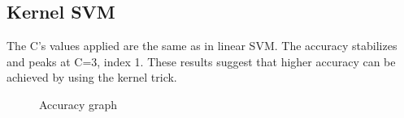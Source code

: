 \subsection{Kernel SVM}
The C's values applied are the same as in linear SVM. The accuracy stabilizes and peaks at C=3, index 1. These results suggest that higher accuracy can be achieved by using the kernel trick.   
\\
\par
\begin{figure}[H]
  \centering
  \hfill
  \hfill
   \caption{Accuracy graph}
\end{figure}
\newpage
